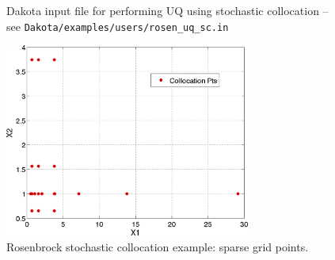 \begin{figure}[htbp!]
  \centering
  \begin{bigbox}
    \begin{small}
    \end{small}
  \end{bigbox}
\caption{Dakota input file for performing UQ using stochastic collocation --
see \texttt{Dakota/examples/users/rosen\_uq\_sc.in} }
\label{uq:figure11}
\end{figure}

\begin{figure}[htbp!]
  \centering
  \includegraphics[height=2.5in]{images/rosen_sc_pts}
  \caption{Rosenbrock stochastic collocation example: sparse grid points.}
  \label{uq:figure11b}
\end{figure}

